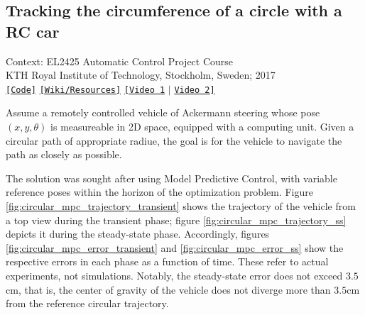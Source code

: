 \subsection{Tracking the circumference of a circle with a RC car}

\noindent Context: EL2425 Automatic Control Project Course\\
\noindent KTH Royal Institute of Technology, Stockholm, Sweden; 2017\\

\noindent \href{https://github.com/li9i/HT16_P2_EL2425}{\texttt{[Code]}} \href{https://github.com/li9i/HT16_P2_EL2425_resources}{\texttt{[Wiki/Resources]}} \href{https://www.youtube.com/watch?v=Vh1huYlyD_8}{\texttt{[Video 1}} $|$ \href{https://youtu.be/937OZez1iN8?t=69}{\texttt{Video 2]}} \\


\begin{problem}
Assume a remotely controlled vehicle of Ackermann steering whose pose
$(x,y,\theta)$ is measureable in 2D space, equipped with a computing unit.
Given a circular path of appropriate radiue, the goal is for the vehicle to
navigate the path as closely as possible.
\end{problem}

The solution was sought after using Model Predictive Control, with variable
reference poses within the horizon of the optimization problem. Figure
\ref{fig:circular_mpc_trajectory_transient} shows the trajectory of the vehicle
from a top view during the transient phase; figure
\ref{fig:circular_mpc_trajectory_ss} depicts it during the steady-state phase.
Accordingly, figures \ref{fig:circular_mpc_error_transient} and
\ref{fig:circular_mpc_error_ss} show the respective errors in each phase as a
function of time. These refer to actual experiments, not simulations.  Notably,
the steady-state error does not exceed $3.5$cm, that is, the center of gravity
of the vehicle does not diverge more than $3.5$cm from the reference circular
trajectory.

\noindent{}

